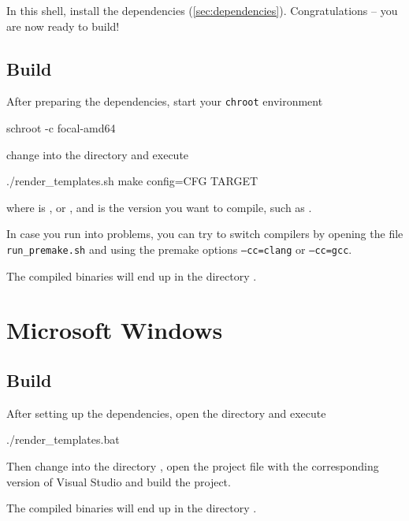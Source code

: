 In this  shell, install the dependencies
(\ref{sec:dependencies}).  Congratulations -- you are now ready to
build!

\newpage %

\subsection{Build}

After preparing the dependencies, start your \texttt{chroot}
environment

\begin{Verbatim64}
  schroot -c focal-amd64
\end{Verbatim64}

change into the directory  and execute

\begin{VerbatimBoth}
  ./render_templates.sh
  make config=CFG TARGET
\end{VerbatimBoth}

where  is , or
, and  is the version
you want to compile, such as .

In case you run into problems, you can try to switch compilers by
opening the file \texttt{run\_premake.sh} and using the premake
options \texttt{--cc=clang} or \texttt{--cc=gcc}.

The compiled binaries will end up in the directory .

\newpage %

\section{Microsoft Windows}

\subsection{Build}

After setting up the dependencies, open the directory 
and execute

\begin{VerbatimBoth}
  ./render_templates.bat
\end{VerbatimBoth}

Then change into the directory , open the
project file with the corresponding version of Visual Studio and build
the project.

The compiled binaries will end up in the directory .

